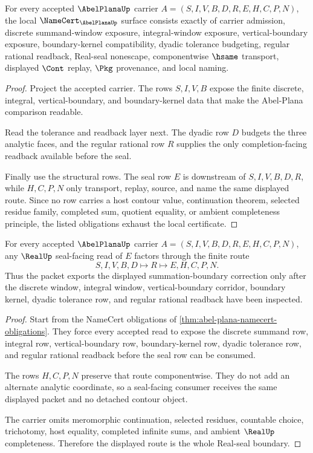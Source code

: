 \begin{theorem}
\label{thm:abel-plana-namecert-obligations}
For every accepted $\AbelPlanaUp$ carrier $A=(S,I,V,B,D,R,E,H,C,P,N)$, the local $\NameCert_{\AbelPlanaUp}$ surface consists exactly of carrier admission, discrete summand-window exposure, integral-window exposure, vertical-boundary exposure, boundary-kernel compatibility, dyadic tolerance budgeting, regular rational readback, Real-seal nonescape, componentwise $\hsame$ transport, displayed $\Cont$ replay, $\Pkg$ provenance, and local naming.
\end{theorem}
\begin{proof}
Project the accepted carrier. The rows $S,I,V,B$ expose the finite discrete, integral, vertical-boundary, and boundary-kernel data that make the Abel-Plana comparison readable.

Read the tolerance and readback layer next. The dyadic row $D$ budgets the three analytic faces, and the regular rational row $R$ supplies the only completion-facing readback available before the seal.

Finally use the structural rows. The seal row $E$ is downstream of $S,I,V,B,D,R$, while $H,C,P,N$ only transport, replay, source, and name the same displayed route. Since no row carries a host contour value, continuation theorem, selected residue family, completed sum, quotient equality, or ambient completeness principle, the listed obligations exhaust the local certificate.
\end{proof}

\begin{theorem}
\label{thm:abel-plana-real-seal-nonescape}
For every accepted $\AbelPlanaUp$ carrier $A=(S,I,V,B,D,R,E,H,C,P,N)$, any $\RealUp$ seal-facing read of $E$ factors through the finite route
$$
S,I,V,B,D \longmapsto R \longmapsto E,H,C,P,N.
$$
Thus the packet exports the displayed summation-boundary correction only after the discrete window, integral window, vertical-boundary corridor, boundary kernel, dyadic tolerance row, and regular rational readback have been inspected.
\end{theorem}
\begin{proof}
Start from the NameCert obligations of \autoref{thm:abel-plana-namecert-obligations}. They force every accepted read to expose the discrete summand row, integral row, vertical-boundary row, boundary-kernel row, dyadic tolerance row, and regular rational readback before the seal row can be consumed.

The rows $H,C,P,N$ preserve that route componentwise. They do not add an alternate analytic coordinate, so a seal-facing consumer receives the same displayed packet and no detached contour object.

The carrier omits meromorphic continuation, selected residues, countable choice, trichotomy, host equality, completed infinite sums, and ambient $\RealUp$ completeness. Therefore the displayed route is the whole Real-seal boundary.
\end{proof}

